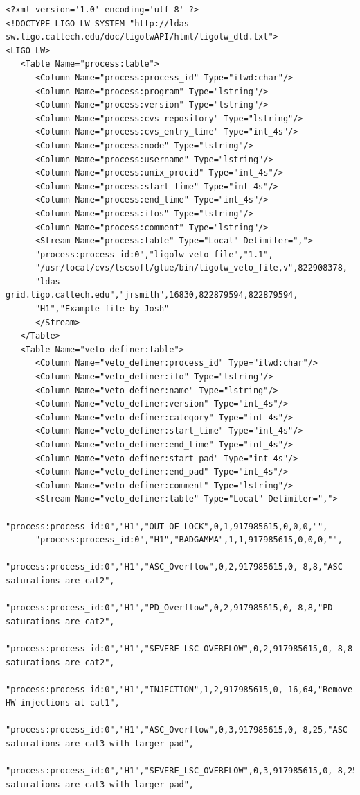 {{\tiny
\begin{verbatim}
<?xml version='1.0' encoding='utf-8' ?>
<!DOCTYPE LIGO_LW SYSTEM "http://ldas-sw.ligo.caltech.edu/doc/ligolwAPI/html/ligolw_dtd.txt">
<LIGO_LW>
   <Table Name="process:table">
      <Column Name="process:process_id" Type="ilwd:char"/>
      <Column Name="process:program" Type="lstring"/>
      <Column Name="process:version" Type="lstring"/>
      <Column Name="process:cvs_repository" Type="lstring"/>
      <Column Name="process:cvs_entry_time" Type="int_4s"/>
      <Column Name="process:node" Type="lstring"/>
      <Column Name="process:username" Type="lstring"/>
      <Column Name="process:unix_procid" Type="int_4s"/>
      <Column Name="process:start_time" Type="int_4s"/>
      <Column Name="process:end_time" Type="int_4s"/>
      <Column Name="process:ifos" Type="lstring"/>
      <Column Name="process:comment" Type="lstring"/>
      <Stream Name="process:table" Type="Local" Delimiter=",">
      "process:process_id:0","ligolw_veto_file","1.1",
      "/usr/local/cvs/lscsoft/glue/bin/ligolw_veto_file,v",822908378,
      "ldas-grid.ligo.caltech.edu","jrsmith",16830,822879594,822879594,
      "H1","Example file by Josh"
      </Stream>
   </Table>
   <Table Name="veto_definer:table">
      <Column Name="veto_definer:process_id" Type="ilwd:char"/>
      <Column Name="veto_definer:ifo" Type="lstring"/>
      <Column Name="veto_definer:name" Type="lstring"/>
      <Column Name="veto_definer:version" Type="int_4s"/>
      <Column Name="veto_definer:category" Type="int_4s"/>
      <Column Name="veto_definer:start_time" Type="int_4s"/>
      <Column Name="veto_definer:end_time" Type="int_4s"/>
      <Column Name="veto_definer:start_pad" Type="int_4s"/>
      <Column Name="veto_definer:end_pad" Type="int_4s"/>
      <Column Name="veto_definer:comment" Type="lstring"/>
      <Stream Name="veto_definer:table" Type="Local" Delimiter=",">
      "process:process_id:0","H1","OUT_OF_LOCK",0,1,917985615,0,0,0,"",
      "process:process_id:0","H1","BADGAMMA",1,1,917985615,0,0,0,"",
      "process:process_id:0","H1","ASC_Overflow",0,2,917985615,0,-8,8,"ASC saturations are cat2",
      "process:process_id:0","H1","PD_Overflow",0,2,917985615,0,-8,8,"PD saturations are cat2",
      "process:process_id:0","H1","SEVERE_LSC_OVERFLOW",0,2,917985615,0,-8,8,"LSC saturations are cat2",
      "process:process_id:0","H1","INJECTION",1,2,917985615,0,-16,64,"Remove HW injections at cat1",
      "process:process_id:0","H1","ASC_Overflow",0,3,917985615,0,-8,25,"ASC saturations are cat3 with larger pad",
      "process:process_id:0","H1","SEVERE_LSC_OVERFLOW",0,3,917985615,0,-8,25,"LSC saturations are cat3 with larger pad",

\end{verbatim}}}
